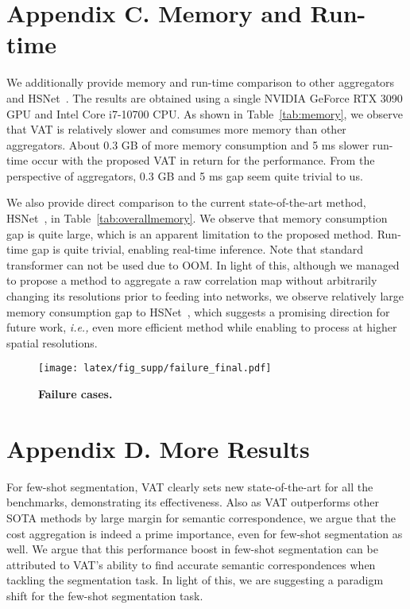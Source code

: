 \section*{Appendix C. Memory and Run-time}
We additionally provide memory and run-time comparison to other aggregators and HSNet~\cite{min2021hypercorrelation}. The results are obtained using a single NVIDIA GeForce RTX 3090 GPU and Intel Core i7-10700 CPU. As shown in Table~\ref{tab:memory}, we observe that VAT is relatively slower and comsumes more memory than other aggregators. About 0.3 GB of more memory consumption and 5 ms slower run-time occur  with the proposed VAT in return for the performance. From the perspective of aggregators, 0.3 GB and 5 ms gap seem quite trivial to us.

We also provide direct comparison to the current state-of-the-art method, HSNet~\cite{min2021hypercorrelation}, in Table~\ref{tab:overallmemory}. We observe that memory consumption gap is quite large, which is an apparent limitation to the proposed method. Run-time gap is quite trivial, enabling real-time inference. Note that standard transformer can not be used due to OOM. In light of this, although  we managed to propose a method to aggregate a raw correlation map without arbitrarily changing its resolutions prior to feeding into networks, we observe relatively large memory consumption gap to HSNet~\cite{min2021hypercorrelation}, which suggests a promising direction for future work, {\it i.e.,} even more efficient method while enabling to process at higher spatial resolutions. 



\begin{figure}[t]
\centering
\texttt{[image: latex/fig\_supp/failure\_final.pdf]}
\caption{\textbf{Failure cases.}   }
\label{Failure}
\end{figure}



\section*{Appendix D. More Results}
For few-shot segmentation, VAT clearly sets new state-of-the-art for all the benchmarks, demonstrating its effectiveness. Also as VAT outperforms other SOTA methods by large margin for semantic correspondence, we argue that the cost aggregation is indeed a prime importance, even for few-shot segmentation as well. We argue that this performance boost in few-shot segmentation can be attributed to VAT's ability to find accurate semantic correspondences when tackling the segmentation task. In light of this, we are suggesting a paradigm shift for the few-shot segmentation task.
\vspace{-10pt}
